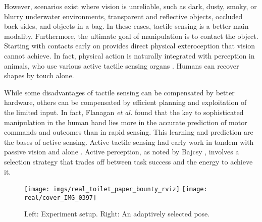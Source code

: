 \documentclass[letterpaper, 10 pt, conference]{ieeeconf}  %
\begin{document}
However, scenarios exist where vision is unreliable, such as dark, dusty, smoky, or blurry underwater environments, transparent and reflective objects, occluded back sides, and objects in a bag. 
In these cases, tactile sensing is a better main modality.
Furthermore, the ultimate goal of manipulation is to contact the object. Starting with contacts early on provides direct physical exteroception that vision cannot achieve.
In fact, physical action is naturally integrated with perception in animals, who use various active tactile sensing organs \cite{prescott2011}. Humans can recover shapes by touch alone.


While some disadvantages of tactile sensing can be compensated by better hardware, 
others can be compensated by efficient planning and exploitation of the limited input. In fact, Flanagan \textit{et al.} \cite{flanagan2006} found that the key to sophisticated manipulation in the human hand lies more in the accurate prediction of motor commands and outcomes than in rapid sensing. This learning and prediction are the bases of active sensing.
%
Active tactile sensing had early work in tandem with passive vision \cite{allen1985, stansfield1988, allen1988} and alone \cite{schneiter1986}. Active perception, as noted by Bajcsy \cite{bajcsy1992}, involves a selection strategy that trades off between task success and the energy to achieve it.

\begin{figure}[thpb]
  \centering
  \texttt{[image: imgs/real\_toilet\_paper\_bounty\_rviz]}
  \texttt{[image: real/cover\_IMG\_0397]}
  \caption{Left: Experiment setup. Right: An adaptively selected pose.}
  \label{fig:intro}
  \vspace{-6mm}
\end{figure}
\end{document}

